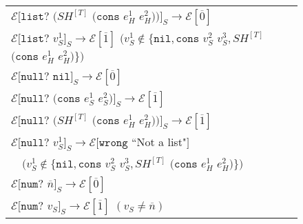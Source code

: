 \begin{figure}[p]
\begin{tabular}{l}
\vspace{5pt}

$\mathscr{E}[\mathtt{list?}$ $(SH^{[T]}$ $(\mathtt{cons}$ $e_{H}^{1}$ $e_{H}^{2}))]_{S}\rightarrow\mathscr{E}[\overline{0}]$ \\

\vspace{5pt}

$\mathscr{E}[\mathtt{list?}$ $v_{S}^{1}]_{S}\rightarrow\mathscr{E}[\overline{1}]$ $(v_{S}^{1}\not\in\lbrace\mathtt{nil},\mathtt{cons}$ $v_{S}^{2}$ $v_{S}^{3},SH^{[T]}$ $(\mathtt{cons}$ $e_{H}^{1}$ $e_{H}^{2})\rbrace)$ \\

\vspace{5pt}

$\mathscr{E}[\mathtt{null?}$ $\mathtt{nil}]_{S}\rightarrow\mathscr{E}[\overline{0}]$ \\

\vspace{5pt}

$\mathscr{E}[\mathtt{null?}$ $(\mathtt{cons}$ $e_{S}^{1}$ $e_{S}^{2})]_{S}\rightarrow\mathscr{E}[\overline{1}]$ \\

\vspace{5pt}

$\mathscr{E}[\mathtt{null?}$ $(SH^{[T]}$ $(\mathtt{cons}$ $e_{H}^{1}$ $e_{H}^{2}))]_{S}\rightarrow\mathscr{E}[\overline{1}]$ \\

\vspace{5pt}

$\mathscr{E}[\mathtt{null?}$ $v_{S}^{1}]_{S}\rightarrow\mathscr{E}[\mathtt{wrong}$ ``Not a list"$]$ \\

\vspace{5pt}

$\quad(v_{S}^{1}\not\in\lbrace\mathtt{nil},\mathtt{cons}$ $v_{S}^{2}$ $v_{S}^{3},SH^{[T]}$ $(\mathtt{cons}$ $e_{H}^{1}$ $e_{H}^{2})\rbrace)$ \\

\vspace{5pt}

$\mathscr{E}[\mathtt{num?}$ $\overline{n}]_{S}\rightarrow\mathscr{E}[\overline{0}]$ \\

\vspace{5pt}

$\mathscr{E}[\mathtt{num?}$ $v_{S}]_{S}\rightarrow\mathscr{E}[\overline{1}]$ $(v_{S}\neq\overline{n})$ \\


\end{tabular}
\end{figure}
